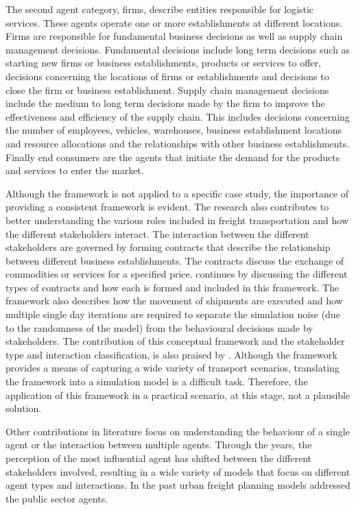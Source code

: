 The second agent category, firms, describe entities responsible for logistic services. These agents operate one or more establishments at different locations. Firms are responsible for fundamental business decisions as well as supply chain management decisions. Fundamental decisions include long term decisions such as starting new firms or business establishments, products or services to offer, decisions concerning the locations of firms or establishments and decisions to close the firm or business establishment. Supply chain management decisions include the medium to long term decisions made by the firm to improve the effectiveness and efficiency of the supply chain. This includes decisions concerning the number of employees, vehicles, warehouses, business establishment locations and resource allocations and the relationships with other business establishments. Finally end consumers are the agents that initiate the demand for the products and services to enter the market.\par

Although the framework is not applied to a specific case study, the importance of providing a consistent framework is evident. The research also contributes to better understanding the various roles included in freight transportation and how the different stakeholders interact. The interaction between the different stakeholders are governed by forming contracts that describe the relationship between different business establishments. The contracts discuss the exchange of commodities or services for a specified price. \citet{roorda2010conceptual} continues by discussing the different types of contracts and how each is formed and included in this framework. The framework also describes how the movement of shipments are executed and how multiple single day iterations are required to separate the simulation noise (due to the randomness of the model) from the behavioural decisions made by stakeholders. The contribution of this conceptual framework and the stakeholder type and interaction classification, is also praised by \citet{bean2020behavioural}. Although the framework provides a means of capturing a wide variety of transport scenarios, translating the framework into a simulation model is a difficult task. Therefore, the application of this framework in a practical scenario, at this stage, not a plausible solution. \par

Other contributions in literature focus on understanding the behaviour of a single agent or the interaction between multiple agents. Through the years, the perception of the most influential agent has shifted between the different stakeholders involved, resulting in a wide variety of models that focus on different agent types and interactions. In the past urban freight planning models addressed the public sector agents.

